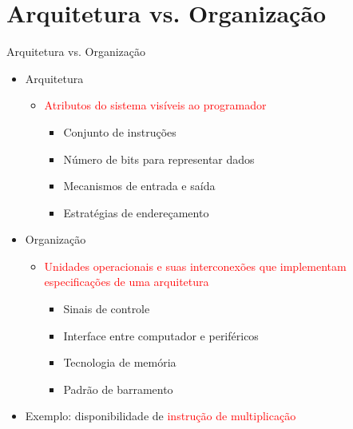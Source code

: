 \section[ slide = true]{Arquitetura vs. Organização}
\begin{slide}[toc=]{Arquitetura vs. Organização}
	\begin{itemize}
		\item Arquitetura
   \begin{itemize}
	   \item \textcolor{red}{Atributos do sistema visíveis ao programador}%
         \begin{itemize}
            \item Conjunto de instruções
            \item Número de bits para representar dados
            \item Mecanismos de entrada e saída
            \item Estratégias de endereçamento
         \end{itemize}
   \end{itemize}
			\item Organização

   \begin{itemize}
         \item \textcolor{red}{Unidades operacionais e suas interconexões que implementam especificações de uma arquitetura}
         \begin{itemize}
            \item Sinais de controle  
            \item Interface entre computador e periféricos
            \item Tecnologia de memória
            \item Padrão de barramento
         \end{itemize}
    \end{itemize}
	\item Exemplo: disponibilidade de \textcolor{red}{instrução de multiplicação}
    \end{itemize}
\end{slide}

